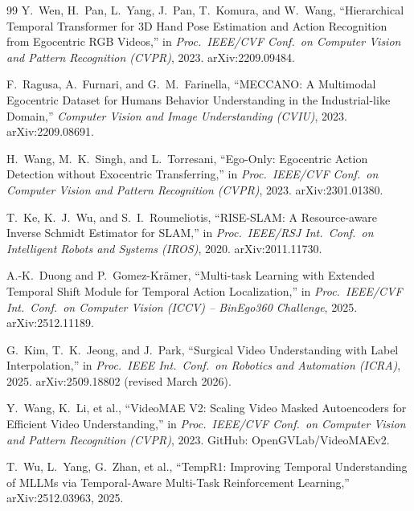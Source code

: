 \documentclass[11pt,a4paper]{article}
\begin{document}
\begin{thebibliography}{99}
Y.~Wen, H.~Pan, L.~Yang, J.~Pan, T.~Komura, and W.~Wang,
``Hierarchical Temporal Transformer for 3D Hand Pose Estimation and Action Recognition from Egocentric RGB Videos,''
in \emph{Proc.\ IEEE/CVF Conf.\ on Computer Vision and Pattern Recognition (CVPR)}, 2023.
arXiv:2209.09484.

F.~Ragusa, A.~Furnari, and G.~M.~Farinella,
``MECCANO: A Multimodal Egocentric Dataset for Humans Behavior Understanding in the Industrial-like Domain,''
\textit{Computer Vision and Image Understanding (CVIU)}, 2023.
arXiv:2209.08691.

H.~Wang, M.~K.~Singh, and L.~Torresani,
``Ego-Only: Egocentric Action Detection without Exocentric Transferring,''
in \emph{Proc.\ IEEE/CVF Conf.\ on Computer Vision and Pattern Recognition (CVPR)}, 2023.
arXiv:2301.01380.

T.~Ke, K.~J.~Wu, and S.~I.~Roumeliotis,
``RISE-SLAM: A Resource-aware Inverse Schmidt Estimator for SLAM,''
in \emph{Proc.\ IEEE/RSJ Int.\ Conf.\ on Intelligent Robots and Systems (IROS)}, 2020.
arXiv:2011.11730.

A.-K.~Duong and P.~Gomez-Kr\"amer,
``Multi-task Learning with Extended Temporal Shift Module for Temporal Action Localization,''
in \emph{Proc.\ IEEE/CVF Int.\ Conf.\ on Computer Vision (ICCV) -- BinEgo360 Challenge}, 2025.
arXiv:2512.11189.

G.~Kim, T.~K.~Jeong, and J.~Park,
``Surgical Video Understanding with Label Interpolation,''
in \emph{Proc.\ IEEE Int.\ Conf.\ on Robotics and Automation (ICRA)}, 2025.
arXiv:2509.18802 (revised March 2026).

Y.~Wang, K.~Li, et al.,
``VideoMAE V2: Scaling Video Masked Autoencoders for Efficient Video Understanding,''
in \emph{Proc.\ IEEE/CVF Conf.\ on Computer Vision and Pattern Recognition (CVPR)}, 2023.
GitHub: OpenGVLab/VideoMAEv2.

T.~Wu, L.~Yang, G.~Zhan, et al.,
``TempR1: Improving Temporal Understanding of MLLMs via Temporal-Aware Multi-Task Reinforcement Learning,''
arXiv:2512.03963, 2025.

\end{thebibliography}
\end{document}
